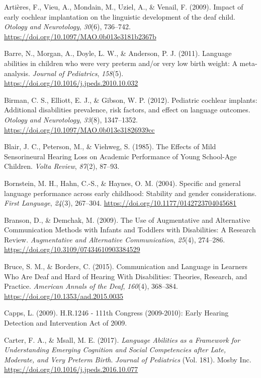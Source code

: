 \documentclass[english,man]{apa6}
\begin{document}
\leavevmode\hypertarget{ref-artieres2009}{}%
Artières, F., Vieu, A., Mondain, M., Uziel, A., \& Venail, F. (2009). Impact of early cochlear implantation on the linguistic development of the deaf child. \emph{Otology and Neurotology}, \emph{30}(6), 736--742. \url{https://doi.org/10.1097/MAO.0b013e3181b2367b}

\leavevmode\hypertarget{ref-barre2011}{}%
Barre, N., Morgan, A., Doyle, L. W., \& Anderson, P. J. (2011). Language abilities in children who were very preterm and/or very low birth weight: A meta-analysis. \emph{Journal of Pediatrics}, \emph{158}(5). \url{https://doi.org/10.1016/j.jpeds.2010.10.032}

\leavevmode\hypertarget{ref-birman2012}{}%
Birman, C. S., Elliott, E. J., \& Gibson, W. P. (2012). Pediatric cochlear implants: Additional disabilities prevalence, risk factors, and effect on language outcomes. \emph{Otology and Neurotology}, \emph{33}(8), 1347--1352. \url{https://doi.org/10.1097/MAO.0b013e31826939cc}

\leavevmode\hypertarget{ref-blair1985}{}%
Blair, J. C., Peterson, M., \& Viehweg, S. (1985). The Effects of Mild Sensorineural Hearing Loss on Academic Performance of Young School-Age Children. \emph{Volta Review}, \emph{87}(2), 87--93.

\leavevmode\hypertarget{ref-bornstein2004}{}%
Bornstein, M. H., Hahn, C.-S., \& Haynes, O. M. (2004). Specific and general language performance across early childhood: Stability and gender considerations. \emph{First Language}, \emph{24}(3), 267--304. \url{https://doi.org/10.1177/0142723704045681}

\leavevmode\hypertarget{ref-branson2009}{}%
Branson, D., \& Demchak, M. (2009). The Use of Augmentative and Alternative Communication Methods with Infants and Toddlers with Disabilities: A Research Review. \emph{Augmentative and Alternative Communication}, \emph{25}(4), 274--286. \url{https://doi.org/10.3109/07434610903384529}

\leavevmode\hypertarget{ref-bruce2015}{}%
Bruce, S. M., \& Borders, C. (2015). Communication and Language in Learners Who Are Deaf and Hard of Hearing With Disabilities: Theories, Research, and Practice. \emph{American Annals of the Deaf}, \emph{160}(4), 368--384. \url{https://doi.org/10.1353/aad.2015.0035}

\leavevmode\hypertarget{ref-capps2009}{}%
Capps, L. (2009). H.R.1246 - 111th Congress (2009-2010): Early Hearing Detection and Intervention Act of 2009.

\leavevmode\hypertarget{ref-carter2017}{}%
Carter, F. A., \& Msall, M. E. (2017). \emph{Language Abilities as a Framework for Understanding Emerging Cognition and Social Competencies after Late, Moderate, and Very Preterm Birth}. \emph{Journal of Pediatrics} (Vol. 181). Mosby Inc. \url{https://doi.org/10.1016/j.jpeds.2016.10.077}
\end{document}
